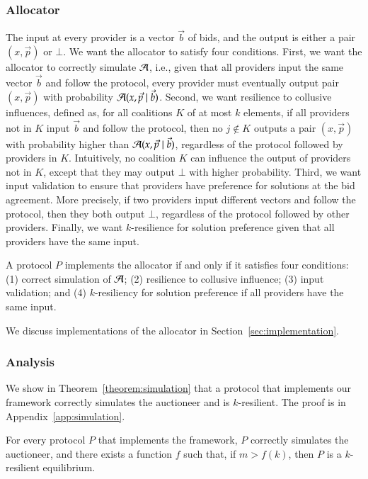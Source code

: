 \subsubsection*{Allocator} The input at every provider is a vector $\vec{b}$ of bids,
and the output is either a pair $(x,\vec{p})$ or $\bot$.
We want the allocator to satisfy four conditions. First, we want the allocator
to correctly simulate $\mathcal{A}$, i.e., given that
all providers input the same vector $\vec{b}$ and follow the protocol,
every provider must eventually output pair $(x,\vec{p})$
with probability $\mathcal{A}(x,\vec{p} \mid \vec{b})$.
Second, we want resilience to collusive influences,
defined as, for all coalitions $K$ of at most $k$ elements,
if all providers not in $K$ input $\vec{b}$
and follow the protocol, then no $j \notin K$ outputs a pair $(x,\vec{p})$
with probability higher than $\mathcal{A}(x,\vec{p} \mid \vec{b})$,
regardless of the protocol followed by providers in $K$.
Intuitively, no coalition $K$ can influence the output of providers not in $K$,
except that they may output $\bot$ with higher probability.
Third, we want input validation to ensure that
providers have preference for solutions at the bid agreement.
More precisely, if two providers input different vectors
and follow the protocol, then they both output $\bot$,
regardless of the protocol followed by other providers.
Finally, we want $k$-resilience for solution preference
given that all providers have the same input.

\begin{property}
\label{prop:allocator}
A protocol $P$ implements the allocator if and only if it satisfies four conditions:
(1) correct simulation of $\mathcal{A}$; (2) resilience to collusive influence;
(3) input validation; and (4) $k$-resiliency for solution preference
if all providers have the same input.
\end{property}

We discuss implementations of the allocator in Section~\ref{sec:implementation}.

\subsubsection*{Analysis} We show in Theorem~\ref{theorem:simulation}
that a protocol that implements our framework correctly
simulates the auctioneer and is $k$-resilient.
The proof is in Appendix~\ref{app:simulation}.

\begin{theorem}
\label{theorem:simulation}
For every protocol $P$ that implements the framework,
$P$ correctly simulates the auctioneer,
and there exists a function $f$ such that, if $m > f(k)$,
then $P$ is a $k$-resilient equilibrium.
\end{theorem}

